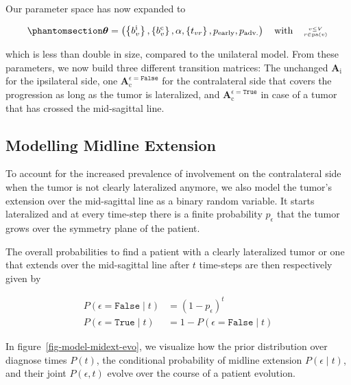 \documentclass[
  sn-mathphys-num,
]{sn-jnl}
\begin{document}
Our parameter space has now expanded to

\begin{equation}\phantomsection\label{eq-bi-param-space}{
\boldsymbol{\theta} = \left( \left\{ b_v^\text{i} \right\}, \left\{ b_v^\text{c} \right\}, \alpha, \left\{ t_{vr} \right\}, p_\text{early}, p_\text{adv.} \right) \quad \text{with} \quad \genfrac{}{}{0pt}{2}{v\leq V}{r\in\operatorname{pa}(v)}
}\end{equation}

which is less than double in size, compared to the unilateral model.
From these parameters, we now build three different transition matrices:
The unchanged \(\mathbf{A}_\text{i}\) for the ipsilateral side, one
\(\mathbf{A}_\text{c}^{\epsilon=\texttt{False}}\) for the contralateral
side that covers the progression as long as the tumor is lateralized,
and \(\mathbf{A}_\text{c}^{\epsilon=\texttt{True}}\) in case of a tumor
that has crossed the mid-sagittal line.

\subsection{Modelling Midline Extension}\label{sec-midline}

To account for the increased prevalence of involvement on the
contralateral side when the tumor is not clearly lateralized anymore, we
also model the tumor's extension over the mid-sagittal line as a binary
random variable. It starts lateralized and at every time-step there is a
finite probability \(p_\epsilon\) that the tumor grows over the symmetry
plane of the patient.

The overall probabilities to find a patient with a clearly lateralized
tumor or one that extends over the mid-sagittal line after \(t\)
time-steps are then respectively given by

\[
\begin{aligned}
P(\epsilon = \texttt{False} \mid t) &= (1 - p_\epsilon)^t \\
P(\epsilon = \texttt{True} \mid t) &= 1 - P(\epsilon = \texttt{False} \mid t)
\end{aligned}
\]

In figure~\ref{fig-model-midext-evo}, we visualize how the prior
distribution over diagnose times \(P(t)\), the conditional probability
of midline extension \(P(\epsilon \mid t)\), and their joint
\(P(\epsilon, t)\) evolve over the course of a patient evolution.
\end{document}
